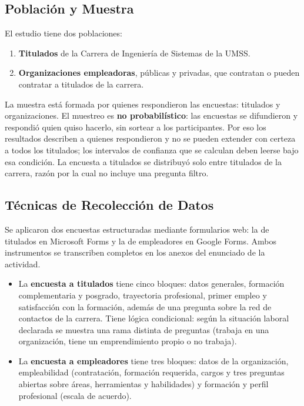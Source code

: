 \documentclass[12pt, a4paper]{article}
\begin{document}
\subsection{Población y Muestra}

El estudio tiene dos poblaciones:

\begin{enumerate}
  \item \textbf{Titulados} de la Carrera de Ingeniería de Sistemas de la
  UMSS.
  \item \textbf{Organizaciones empleadoras}, públicas y privadas, que
  contratan o pueden contratar a titulados de la carrera.
\end{enumerate}

La muestra está formada por quienes respondieron las encuestas:
\nTitulados{} titulados y \nEmpleadores{} organizaciones. El muestreo es
\textbf{no probabilístico}: las encuestas se difundieron y respondió quien
quiso hacerlo, sin sortear a los participantes. Por eso los resultados
describen a quienes respondieron y no se pueden extender con certeza a
todos los titulados; los intervalos de confianza que se calculan deben
leerse bajo esa condición. La encuesta a titulados se distribuyó solo
entre titulados de la carrera, razón por la cual no incluye una pregunta
filtro.

\subsection{Técnicas de Recolección de Datos}

Se aplicaron dos encuestas estructuradas mediante formularios web: la de
titulados en Microsoft Forms y la de empleadores en Google Forms. Ambos
instrumentos se transcriben completos en los anexos del enunciado de la
actividad.

\begin{itemize}
  \item La \textbf{encuesta a titulados} tiene cinco bloques: datos
  generales, formación complementaria y posgrado, trayectoria
  profesional, primer empleo y satisfacción con la formación, además de
  una pregunta sobre la red de contactos de la carrera. Tiene lógica
  condicional: según la situación laboral declarada se muestra una rama
  distinta de preguntas (trabaja en una organización, tiene un
  emprendimiento propio o no trabaja).
  \item La \textbf{encuesta a empleadores} tiene tres bloques: datos de la
  organización, empleabilidad (contratación, formación requerida,
  cargos y tres preguntas abiertas sobre áreas, herramientas y
  habilidades) y formación y perfil profesional (escala de acuerdo).
\end{itemize}
\end{document}

